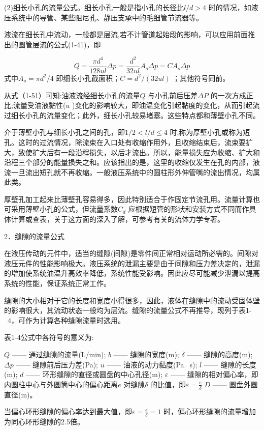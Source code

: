 (2)细长小孔的流量公式。细长小孔一般是指小孔的长径比$ l/d>4 $ 时的情况，如液压系统中的导管、某些阻尼孔、静压支承中的毛细管节流器等。

液流在细长孔中流动，一般都是层流,若不计管道起始段的影响，可以应用前面推出的圆管层流的公式(1-41)，即

$$ Q=\frac{\pi d^4}{128ul}\varDelta p=\frac{d^2}{32ul}A_o\varDelta p=CA_o\varDelta p $$
\noindent 式中$ A_o=\pi d^2/4 $ 即细长小孔截面积；$ C=d^2/\left( 32ul \right)  $ ；其他符号同前。

从式（1-51）可知:油液流经细长小孔的流量$ Q $ 与小孔前后压差$ \varDelta P $ 的一次方成正比;流量受油液黏性($ u $ )变化的影响较大，即油温变化引起黏度的变化，从而引起流过细长小孔的流量变化；此外，细长小孔较易堵塞。这些特点都和薄壁小孔不同。

介于薄壁小孔与细长小孔之间的孔，即$ 1/2<l/d\le 4 $ 时,称为厚壁小孔或称为短孔。这时的过流情况，除流束在入口处有收缩作用外，且收缩结束后，流束要扩大，致使扩大后有一段沿程损失，以后才流出。所以，能量损失应为收缩、扩大和沿程三个部分的能量损失之和。应该指出的是，这里的收缩仅发生在孔的内部，液流一旦流出短孔就不再收缩。一般液压系统中的圆柱形外伸管嘴的流出情况，均属此类。

厚壁孔加工起来比薄壁孔容易得多，因此特别适合于作固定节流孔用。流量计算也可采用薄壁小孔的公式，但流量系数$ C_d $ 应根据短管的形状和安装方式不同而作具体计算或查表，关于这方面的深入了解，可参考有关的流体力学专著。

2．缝隙的流量公式

在液压传动的元件中，适当的缝隙(间隙)是零件间正常相对运动所必需的。间隙对液压元件的性能影响极大。液压系统的泄漏主要是由于间隙和压力差决定的，泄漏的增加使系统油温升高效率降低，系统性能受影响。因此应尽可能减少泄漏以提高系统的性能，保证系统正常工作。

缝隙的大小相对于它的长度和宽度小得很多，因此，液体在缝隙中的流动受固体壁的影响很大，其流动状态一般均为层流。缝隙的流量公式不再推导，现列于表1- 4，可作为计算各种缝隙流量时选用。

表1-4公式中各符号的意义为:

$ Q $  —— 通过缝隙的流量(L/min);
$ b $  —— 缝隙的宽度(m);
$ \delta  $  —— 缝隙的高度(m);
$ \varDelta p $  —— 缝隙前后压力差(Pa);
$ u $  —— 油液的动力黏度(Pa. s);
$ l $  ——  缝隙的长度(m);
$ d $  —— 环形缝隙的直径或圆盘的中心孔径(m);
$ \varepsilon  $  —— 缝隙的相对偏心率，即内圆柱中心与外圆筒中心的偏心距离$ e $ 对缝隙$ \delta  $ 的比值，即$ \varepsilon =\frac{e}{\delta} $ 
$ D $  —— 圆盘外圆直径(m)。

当偏心环形缝隙的偏心率达到最大值，即$ \varepsilon =\frac{e}{\delta}=1 $ 时，偏心环形缝隙的流量增加为同心环形缝隙的2.5倍。

